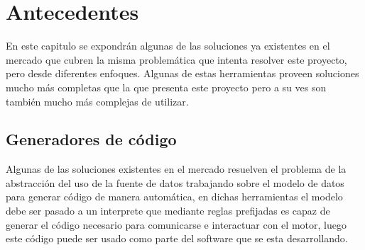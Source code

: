 \chapter{Antecedentes}
En este capitulo se expondrán algunas de las soluciones ya existentes en el mercado que cubren la misma problemática que intenta resolver este proyecto, pero desde diferentes enfoques. Algunas de estas herramientas proveen soluciones mucho más completas que la que presenta este proyecto pero a su ves son también mucho más complejas de utilizar.
%
%
\section{Generadores de código}
Algunas de las soluciones existentes en el mercado resuelven el problema de la abstracción del uso de la fuente de datos trabajando sobre el modelo de datos para generar código de manera automática, en dichas herramientas el modelo debe ser pasado a un interprete que mediante reglas prefijadas es capaz de generar el código necesario para comunicarse e interactuar con el motor, luego este código puede ser usado como parte del software que se esta desarrollando.

